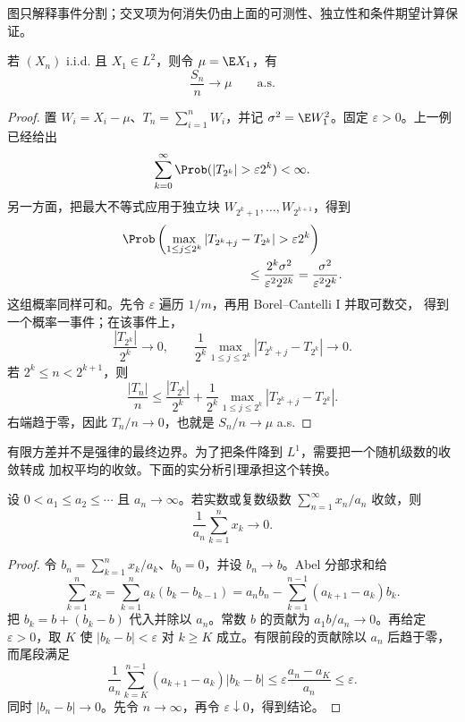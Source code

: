 图只解释事件分割；交叉项为何消失仍由上面的可测性、独立性和条件期望计算保证。

\begin{theorem}\label{theorem:5-4-2-3}
若 $(X_n)$ i.i.d. 且 $X_1\in L^2$，则令 $\mu=\E X_1$，有
\[
 \frac{S_n}{n}\longrightarrow\mu\qquad\text{a.s.}
\]
\end{theorem}

\begin{proof}
置 $W_i=X_i-\mu$、$T_n=\sum_{i=1}^nW_i$，并记
$\sigma^2=\E W_1^2$。固定 $\varepsilon>0$。上一例已经给出
\[
 \sum_{k=0}^{\infty}
 \Prob(|T_{2^k}|>\varepsilon2^k)<\infty.
\]
另一方面，把最大不等式应用于独立块
$W_{2^k+1},\dots,W_{2^{k+1}}$，得到
\begin{align*}
 &\Prob\left(
 \max_{1\leq j\leq2^k}
 |T_{2^k+j}-T_{2^k}|>\varepsilon2^k
 \right)\\
 &\hspace{35mm}\leq
 \frac{2^k\sigma^2}{\varepsilon^2 2^{2k}}
 =\frac{\sigma^2}{\varepsilon^2 2^k}.
\end{align*}
这组概率同样可和。先令 $\varepsilon$ 遍历 $1/m$，再用 Borel--Cantelli I 并取可数交，
得到一个概率一事件；在该事件上，
\[
 \frac{|T_{2^k}|}{2^k}\longrightarrow0,
 \qquad
 \frac1{2^k}\max_{1\leq j\leq2^k}
 |T_{2^k+j}-T_{2^k}|\longrightarrow0.
\]
若 $2^k\leq n<2^{k+1}$，则
\[
 \frac{|T_n|}{n}
 \leq\frac{|T_{2^k}|}{2^k}
 +\frac1{2^k}\max_{1\leq j\leq2^k}
 |T_{2^k+j}-T_{2^k}|.
\]
右端趋于零，因此 $T_n/n\to0$，也就是 $S_n/n\to\mu$ a.s.
\end{proof}

有限方差并不是强律的最终边界。为了把条件降到 $L^1$，需要把一个随机级数的收敛转成
加权平均的收敛。下面的实分析引理承担这个转换。

\begin{lemma}[Kronecker 引理]\label{lemma:5-4-2-3}
设 $0<a_1\leq a_2\leq\cdots$ 且 $a_n\to\infty$。若实数或复数级数
$\sum_{n=1}^{\infty}x_n/a_n$ 收敛，则
\[
 \frac1{a_n}\sum_{k=1}^nx_k\longrightarrow0.
\]
\end{lemma}

\begin{proof}
令 $b_n=\sum_{k=1}^nx_k/a_k$、$b_0=0$，并设 $b_n\to b$。Abel 分部求和给
\[
 \sum_{k=1}^nx_k
 =\sum_{k=1}^na_k(b_k-b_{k-1})
 =a_nb_n-\sum_{k=1}^{n-1}(a_{k+1}-a_k)b_k.
\]
把 $b_k=b+(b_k-b)$ 代入并除以 $a_n$。常数 $b$ 的贡献为
$a_1b/a_n\to0$。再给定 $\varepsilon>0$，取 $K$ 使
$|b_k-b|<\varepsilon$ 对 $k\geq K$ 成立。有限前段的贡献除以 $a_n$ 后趋于零，而尾段满足
\[
 \frac1{a_n}\sum_{k=K}^{n-1}(a_{k+1}-a_k)|b_k-b|
 \leq\varepsilon\frac{a_n-a_K}{a_n}\leq\varepsilon.
\]
同时 $|b_n-b|\to0$。先令 $n\to\infty$，再令 $\varepsilon\downarrow0$，得到结论。
\end{proof}

